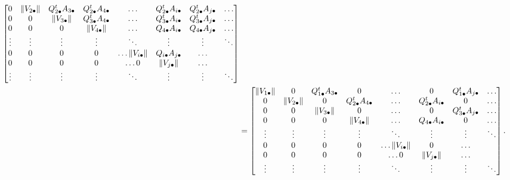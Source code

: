 \begin{questions}
\begin{solution}
\begin{align*}
\begin{bmatrix}
                0 & \| V_{2 \bullet} \| & Q_{2 \bullet}^t A_{3 \bullet} & Q_{2 \bullet}^t A_{4 \bullet} & \ldots & Q_{2 \bullet}^t A_{i \bullet} & Q_{2 \bullet}^t A_{j \bullet} & \ldots \\ 
                0 &  0 & \| V_{3 \bullet} \| & Q_{3 \bullet}^t A_{4 \bullet} & \ldots & Q_{3 \bullet}^t A_{i \bullet} & Q_{3 \bullet}^t A_{j \bullet} & \ldots \\ 
                0 &  0 & 0 & \| V_{4 \bullet} \| &  \ldots & Q_{4 \bullet} A_{i \bullet} & Q_{4 \bullet} A_{j \bullet} & \ldots \\ 
                \vdots & \vdots & \vdots & \vdots & \ddots & \vdots & \vdots & \ddots \\
                0 &  0 & 0 & 0 & \ldots \| V_{i \bullet} \| & Q_{i \bullet} A_{j \bullet} & \ldots \\
                0 &  0 & 0 & 0 & \ldots  0 & \| V_{j \bullet} \|  & \ldots \\
                \vdots & \vdots & \vdots & \vdots & \ddots & \vdots & \vdots & \ddots 
            \end{bmatrix} \\
            &= \begin{bmatrix}
                \| V_{1 \bullet} \| & 0 & Q_{1 \bullet}^t A_{3 \bullet} & 0 & \ldots & 0 & Q_{1 \bullet}^t A_{j \bullet} & \ldots \\  
                0 & \| V_{2 \bullet} \| & 0 & Q_{2 \bullet}^t A_{4 \bullet} & \ldots & Q_{2 \bullet}^t A_{i \bullet} & 0 & \ldots \\ 
                0 &  0 & \| V_{3 \bullet} \| & 0 & \ldots & 0 & Q_{3 \bullet}^t A_{j \bullet} & \ldots \\ 
                0 &  0 & 0 & \| V_{4 \bullet} \| &  \ldots & Q_{4 \bullet} A_{i \bullet} & 0 & \ldots \\ 
                \vdots & \vdots & \vdots & \vdots & \ddots & \vdots & \vdots & \ddots \\
                0 &  0 & 0 & 0 & \ldots \| V_{i \bullet} \| & 0 & \ldots \\
                0 &  0 & 0 & 0 & \ldots  0 & \| V_{j \bullet} \|  & \ldots \\
                \vdots & \vdots & \vdots & \vdots & \ddots & \vdots & \vdots & \ddots 
            \end{bmatrix}.
        \end{align*}
    \end{solution}
\end{questions}
